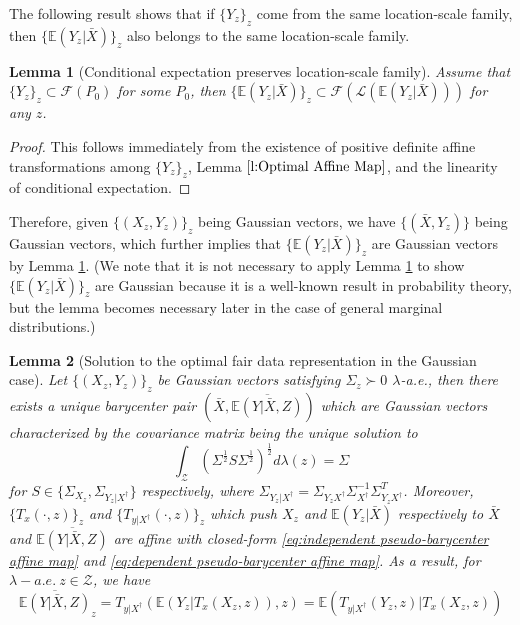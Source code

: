 \documentclass[twoside,11pt]{article}
\newtheorem{lem}{Lemma}[section]{\bfseries}{\itshape}
\begin{document}
The following result shows that if $\{Y_z\}_z$ come from the same location-scale family, then $\{\mathbb{E}(Y_z|\bar{X})\}_z$ also belongs to the same location-scale family.

\begin{lem}[Conditional expectation preserves location-scale family] \label{l:Conditional Expectation Preserves Dependent Variable Location-scale Family}
Assume that $\{Y_z\}_z \subset \mathcal{F}(P_0)$ for some $P_0$, then $\{\mathbb{E}(Y_z|\bar{X})\}_z \subset \mathcal{F}(\mathcal{L}(\mathbb{E}(Y_z|\bar{X})))$ for any $z$.
\end{lem}

\begin{proof}
This follows immediately from the existence of positive definite affine transformations among $\{Y_z\}_z$, Lemma $\ref{l:Optimal Affine Map}$, and the linearity of conditional expectation.
\end{proof}

Therefore, given $\{(X_z,Y_z)\}_z$ being Gaussian vectors, we have $\{(\bar{X},Y_z)\}$ being Gaussian vectors, which further implies that $\{\mathbb{E}(Y_z|\bar{X})\}_z$ are Gaussian vectors by Lemma \ref{l:Conditional Expectation Preserves Dependent Variable Location-scale Family}. (We note that it is not necessary to apply Lemma \ref{l:Conditional Expectation Preserves Dependent Variable Location-scale Family} to show $\{\mathbb{E}(Y_z|\bar{X})\}_z$ are Gaussian because it is a well-known result in probability theory, but the lemma becomes necessary later in the case of general marginal distributions.)

\begin{lem}[Solution to the optimal fair data representation in the Gaussian case] \label{l:Solution to the Optimal Fair Data Representation in Gaussian Case}
Let $\{(X_z,Y_z)\}_z$ be Gaussian vectors satisfying $\Sigma_z \succ 0$ $\lambda$-a.e., then there exists a unique barycenter pair $(\bar{X}, \overline{\mathbb{E}(Y| \bar{X},Z)})$ which are Gaussian vectors characterized by the covariance matrix being the unique solution to 
\begin{equation}
\int_{\mathcal{Z}} (\Sigma^{\frac{1}{2}} S \Sigma^{\frac{1}{2}})^{\frac{1}{2}} d\lambda(z) = \Sigma
\end{equation}
for $S \in \{\Sigma_{X_z},\Sigma_{Y_z|X^{\dag}}\}$ respectively, where $\Sigma_{Y_z|X^{\dag}} = \Sigma_{Y_z X^{\dag}} \Sigma_{X^{\dag}}^{-1} \Sigma_{Y_z X^{\dag}}^T$. Moreover, $\{T_x(\cdot,z)\}_z$ and $\{T_{y|X^{\dag}}(\cdot,z)\}_z$ which push $X_z$ and $\mathbb{E}(Y_z|\bar{X})$ respectively to $\bar{X}$ and $\overline{\mathbb{E}(Y|\bar{X},Z)}$ are affine with closed-form \eqref{eq:independent pseudo-barycenter affine map} and \eqref{eq:dependent pseudo-barycenter affine map}. As a result, for $\lambda-a.e. \ z \in \mathcal{Z}$, we have
\begin{equation}
\overline{\mathbb{E}(Y| \bar{X},Z)}_z = T_{y|X^{\dag}}(\mathbb{E}(Y_z | T_x(X_z,z)),z) =  \mathbb{E}(T_{y|X^{\dag}}(Y_z,z) | T_x(X_z,z))
\end{equation}
\end{lem}
\end{document}

